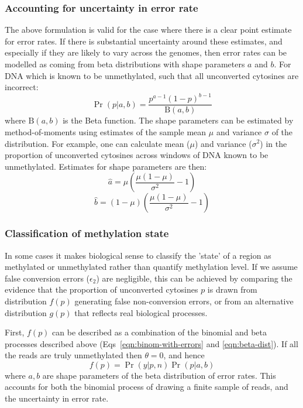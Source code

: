 \documentclass[10pt,draft,letterpaper]{article}
\begin{document}
\subsubsection*{Accounting for uncertainty in error rate} \label{sec:mean-as-beta}

The above formulation is valid for the case where there is a clear point estimate for error rates.
If there is substantial uncertainty around these estimates, and especially if they are likely to vary across the genomes, then error rates can be modelled as coming from beta distributions with shape parameters $a$ and $b$. For DNA which is known to be unmethylated, such that all unconverted cytosines are incorrect:
\begin{equation}
    \label{eqn:beta-dist}
    \Pr(p|a,b) = \frac{p^{a-1} (1-p)^{b-1}}{\textrm{B}(a,b)}
\end{equation}
where $\textrm{B}(a,b)$ is the Beta function.
The shape parameters can be estimated by method-of-moments using estimates of the sample mean $\mu$ and variance $\sigma$ of the distribution.
For example, one can calculate mean ($\mu$) and variance ($\sigma^2$) in the proportion of unconverted cytosines across windows of DNA known to be unmethylated.
Estimates for shape parameters are then:
\begin{equation}
    \hat{a} = \mu(\frac{\mu(1-\mu)}{\sigma^2}-1)
    \label{eqn:beta-a}
\end{equation}
\begin{equation}
    \hat{b} = (1-\mu)(\frac{\mu(1-\mu)}{\sigma^2}-1) 
    \label{eqn:beta-b}
\end{equation}

\subsubsection*{Classification of methylation state} \label{sec:meth-state}

In some cases it makes biological sense to classify the 'state' of a region as methylated or unmethylated rather than quantify methylation level.
If we assume false conversion errors ($\epsilon_2$) are negligible, this can be achieved by comparing the evidence that the proportion of unconverted cytosines $p$ is drawn from distribution $f(p)$ generating false non-conversion errors, or from an alternative distribution $g(p)$ that reflects real biological processes.

First, $f(p)$ can be described as a combination of the binomial and beta processes described above (Eqs~\ref{eqn:binom-with-errors} and \ref{eqn:beta-dist}).
If all the reads are truly unmethylated then $\theta=0$, and hence
\begin{equation}
    f(p) = \Pr(y | p, n) \Pr(p | a, b)
    \label{eqn:f-of-p}
\end{equation}
where $a, b$ are shape parameters of the beta distribution of error rates.
This accounts for both the binomial process of drawing a finite sample of reads, and the uncertainty in error rate.
\end{document}
